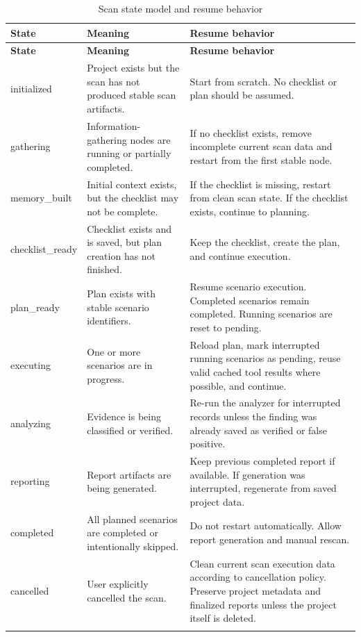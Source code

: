 \documentclass[12pt,a4paper]{report}
\begin{document}
\begin{longtable}{|p{}|p{}|p{}|}
\hline
\textbf{State} & \textbf{Meaning} & \textbf{Resume behavior} \\
\hline
\endfirsthead
\hline
\textbf{State} & \textbf{Meaning} & \textbf{Resume behavior} \\
\hline
\endhead
initialized & Project exists but the scan has not produced stable scan artifacts. &
Start from scratch. No checklist or plan should be assumed. \\
\hline
gathering & Information-gathering nodes are running or partially completed. & If no
checklist exists, remove incomplete current scan data and restart from the first stable
node. \\
\hline
memory\_built & Initial context exists, but the checklist may not be complete. & If the
checklist is missing, restart from clean scan state. If the checklist exists, continue
to planning. \\
\hline
checklist\_ready & Checklist exists and is saved, but plan creation has not finished. &
Keep the checklist, create the plan, and continue execution. \\
\hline
plan\_ready & Plan exists with stable scenario identifiers. & Resume scenario execution.
Completed scenarios remain completed. Running scenarios are reset to pending. \\
\hline
executing & One or more scenarios are in progress. & Reload plan, mark interrupted
running scenarios as pending, reuse valid cached tool results where possible, and
continue. \\
\hline
analyzing & Evidence is being classified or verified. & Re-run the analyzer for
interrupted records unless the finding was already saved as verified or false positive. \\
\hline
reporting & Report artifacts are being generated. & Keep previous completed report if
available. If generation was interrupted, regenerate from saved project data. \\
\hline
completed & All planned scenarios are completed or intentionally skipped. & Do not
restart automatically. Allow report generation and manual rescan. \\
\hline
cancelled & User explicitly cancelled the scan. & Clean current scan execution data
according to cancellation policy. Preserve project metadata and finalized reports unless
the project itself is deleted. \\
\hline
\caption{Scan state model and resume behavior}
\label{tab:scan_state_model}
\end{longtable}
\end{document}
